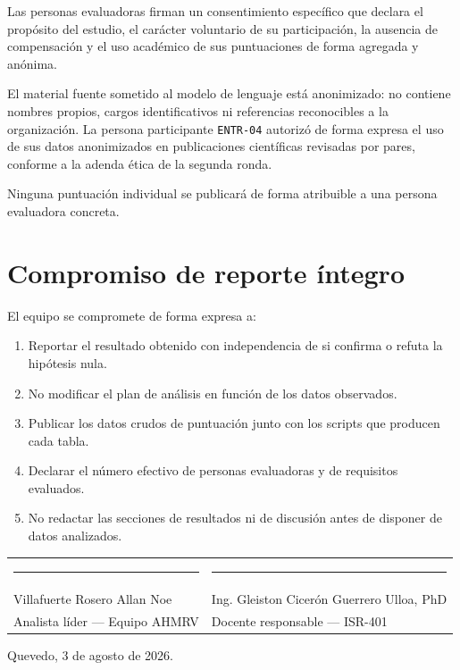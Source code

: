 \documentclass[11pt,a4paper]{article}
\newcommand{\id}[1]{\texttt{#1}}
\begin{document}
Las personas evaluadoras firman un consentimiento específico que declara el propósito del estudio,
el carácter voluntario de su participación, la ausencia de compensación y el uso académico de sus
puntuaciones de forma agregada y anónima.

El material fuente sometido al modelo de lenguaje está anonimizado: no contiene nombres propios,
cargos identificativos ni referencias reconocibles a la organización. La persona participante
\id{ENTR-04} autorizó de forma expresa el uso de sus datos anonimizados en publicaciones
científicas revisadas por pares, conforme a la adenda ética de la segunda ronda.

Ninguna puntuación individual se publicará de forma atribuible a una persona evaluadora concreta.

\section{Compromiso de reporte íntegro}

El equipo se compromete de forma expresa a:

\begin{enumerate}[nosep,leftmargin=1.8em]
  \item Reportar el resultado obtenido con independencia de si confirma o refuta la hipótesis nula.
  \item No modificar el plan de análisis en función de los datos observados.
  \item Publicar los datos crudos de puntuación junto con los scripts que producen cada tabla.
  \item Declarar el número efectivo de personas evaluadoras y de requisitos evaluados.
  \item No redactar las secciones de resultados ni de discusión antes de disponer de datos
        analizados.
\end{enumerate}

\noindent
{}

\vspace{1.4cm}
\noindent
\begin{tabular}{p{7.0cm}p{7.0cm}}
\rule{6.4cm}{0.4pt} & \rule{6.4cm}{0.4pt} \\
Villafuerte Rosero Allan Noe & Ing. Gleiston Cicerón Guerrero Ulloa, PhD \\
Analista líder --- Equipo AHMRV & Docente responsable --- ISR-401 \\
\end{tabular}

\vspace{1.0cm}
\noindent Quevedo, 3 de agosto de 2026.
\end{document}
